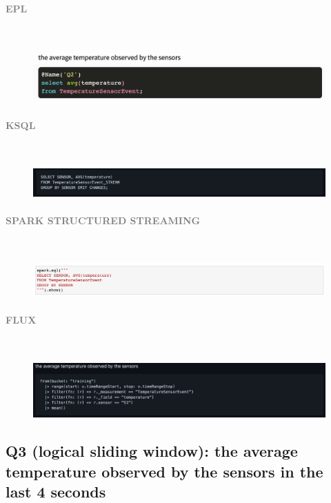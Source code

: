 \documentclass[10pt,a4paper]{article}
\newcommand{\myparagraph}[1]{\paragraph{\normalsize{\textcolor{gray}{\uppercase{\textbf{#1}}}} }\mbox{} \vspace{0.5em}\\}
\begin{document}
\myparagraph{EPL}
\begin{figure}[h!]
 \hfill \includegraphics[width=400pt]{images/epl_Q2}\hspace*{\fill}
\end{figure}
\myparagraph{KSQL}
\begin{figure}[h!]
 \hfill \includegraphics[width=400pt]{images/ksql_Q2}\hspace*{\fill}
\end{figure}
\myparagraph{Spark Structured Streaming}
\begin{figure}[h!]
 \hfill \includegraphics[width=400pt]{images/sss_Q2}\hspace*{\fill}
\end{figure}
\myparagraph{Flux}
\begin{figure}[h!]
 \hfill \includegraphics[width=400pt]{images/flux_Q2}\hspace*{\fill}
\end{figure}

\pagebreak

\subsection{Q3 (logical sliding window): the average temperature observed by the sensors in the last 4 seconds}
\end{document}
